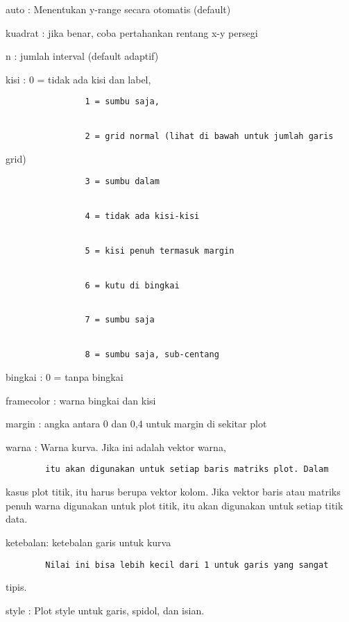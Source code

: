 \documentclass[
]{book}
\begin{document}
auto : Menentukan y-range secara otomatis (default)

kuadrat : jika benar, coba pertahankan rentang x-y persegi

n : jumlah interval (default adaptif)

kisi : 0 = tidak ada kisi dan label,

\begin{verbatim}
                1 = sumbu saja,


                2 = grid normal (lihat di bawah untuk jumlah garis
\end{verbatim}

grid)

\begin{verbatim}
                3 = sumbu dalam


                4 = tidak ada kisi-kisi


                5 = kisi penuh termasuk margin


                6 = kutu di bingkai


                7 = sumbu saja


                8 = sumbu saja, sub-centang
\end{verbatim}

bingkai : 0 = tanpa bingkai

framecolor : warna bingkai dan kisi

margin : angka antara 0 dan 0,4 untuk margin di sekitar plot

warna : Warna kurva. Jika ini adalah vektor warna,

\begin{verbatim}
        itu akan digunakan untuk setiap baris matriks plot. Dalam
\end{verbatim}

kasus plot titik, itu harus berupa vektor kolom. Jika vektor baris atau matriks penuh warna digunakan untuk plot titik, itu akan digunakan untuk setiap titik data.

ketebalan: ketebalan garis untuk kurva

\begin{verbatim}
        Nilai ini bisa lebih kecil dari 1 untuk garis yang sangat
\end{verbatim}

tipis.

style : Plot style untuk garis, spidol, dan isian.
\end{document}
